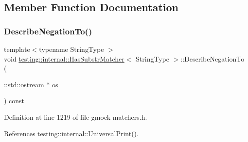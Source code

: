 \subsection{Member Function Documentation}
\mbox{\label{classtesting_1_1internal_1_1HasSubstrMatcher_aa79638f9d3a0c2eb67bc76432f35be1f}} 
\subsubsection{\texorpdfstring{Describe\+Negation\+To()}{DescribeNegationTo()}}
{\footnotesize\ttfamily template$<$typename String\+Type $>$ \\
void \hyperlink{classtesting_1_1internal_1_1HasSubstrMatcher}{testing\+::internal\+::\+Has\+Substr\+Matcher}$<$ String\+Type $>$\+::Describe\+Negation\+To (\begin{DoxyParamCaption}\item[{\+::std\+::ostream $\ast$}]{os }\end{DoxyParamCaption}) const\hspace{0.3cm}{\ttfamily [inline]}}



Definition at line 1219 of file gmock-\/matchers.\+h.



References testing\+::internal\+::\+Universal\+Print().



